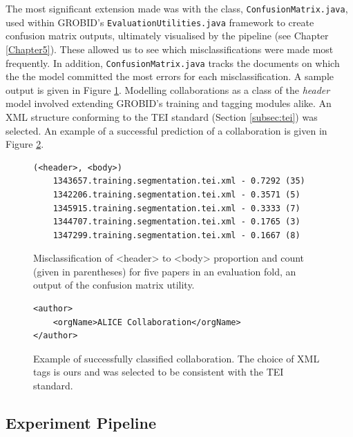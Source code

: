 The most significant extension made was with the class, \texttt{ConfusionMatrix.java}, used within GROBID's \texttt{EvaluationUtilities.java} framework to create confusion matrix outputs, ultimately visualised by the pipeline (see Chapter \ref{Chapter5}). These allowed us to see which misclassifications were made most frequently. In addition, \texttt{ConfusionMatrix.java} tracks the documents on which the the model committed the most errors for each misclassification. A sample output is given in Figure \ref{fig:topk}. Modelling collaborations as a class of the \emph{header} model involved extending GROBID's training and tagging modules alike. An XML structure conforming to the TEI standard (Section \ref{subsec:tei}) was selected. An example of a successful prediction of a collaboration is given in Figure \ref{fig:collaboration}.

\begin{figure}[h]
\centering
\begin{BVerbatim}
(<header>, <body>)
	1343657.training.segmentation.tei.xml - 0.7292 (35)
	1342206.training.segmentation.tei.xml - 0.3571 (5)
	1345915.training.segmentation.tei.xml - 0.3333 (7)
	1344707.training.segmentation.tei.xml - 0.1765 (3)
	1347299.training.segmentation.tei.xml - 0.1667 (8)
\end{BVerbatim}
\caption{Misclassification of <header> to <body> proportion and count (given in parentheses) for five papers in an evaluation fold, an output of the confusion matrix utility.}
\label{fig:topk}
\end{figure}

\begin{figure}[h]
\lstset{language=XML}
\begin{lstlisting}
<author>
    <orgName>ALICE Collaboration</orgName>
</author>
\end{lstlisting}
\caption{Example of successfully classified collaboration. The choice of XML tags is ours and was selected to be consistent with the TEI standard.}
\label{fig:collaboration}
\end{figure}

\subsection{Experiment Pipeline}
\label{subsec:pipeline}

